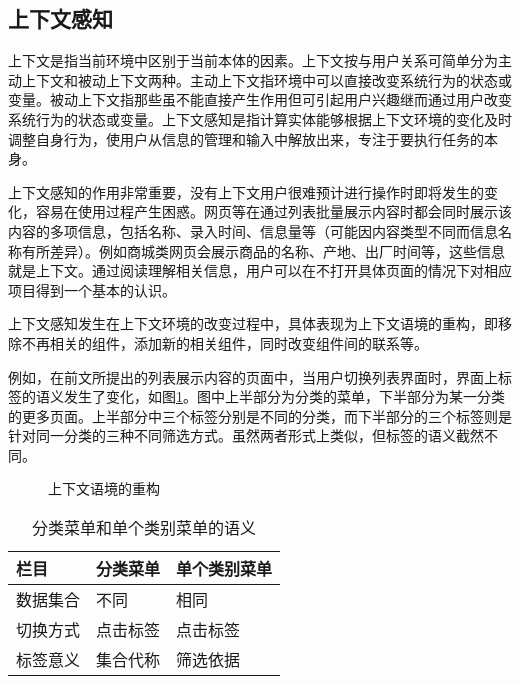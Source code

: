\subsection{上下文感知}
上下文是指当前环境中区别于当前本体的因素。上下文按与用户关系可简单分为主动上下文和被动上下文两种。主动上下文指环境中可以直接改变系统行为的状态或变量。被动上下文指那些虽不能直接产生作用但可引起用户兴趣继而通过用户改变系统行为的状态或变量。上下文感知是指计算实体能够根据上下文环境的变化及时调整自身行为，使用户从信息的管理和输入中解放出来，专注于要执行任务的本身。

上下文感知的作用非常重要，没有上下文用户很难预计进行操作时即将发生的变化，容易在使用过程产生困惑。网页等在通过列表批量展示内容时都会同时展示该内容的多项信息，包括名称、录入时间、信息量等（可能因内容类型不同而信息名称有所差异）。例如商城类网页会展示商品的名称、产地、出厂时间等，这些信息就是上下文。通过阅读理解相关信息，用户可以在不打开具体页面的情况下对相应项目得到一个基本的认识。

上下文感知发生在上下文环境的改变过程中，具体表现为上下文语境的重构，即移除不再相关的组件，添加新的相关组件，同时改变组件间的联系等。

例如，在前文所提出的列表展示内容的页面中，当用户切换列表界面时，界面上标签的语义发生了变化，如图\ref{fig:context}。图中上半部分为分类的菜单，下半部分为某一分类的更多页面。上半部分中三个标签分别是不同的分类，而下半部分的三个标签则是针对同一分类的三种不同筛选方式。虽然两者形式上类似，但标签的语义截然不同。

\begin{figure}[htp]
\centering
{}
\caption{上下文语境的重构}
\label{fig:context}
\end{figure}

\begin{table}[htbp]
\centering
\caption{分类菜单和单个类别菜单的语义}
\vskip 5pt
\begin{tabular}{lll}
\toprule
栏目 & 分类菜单 & 单个类别菜单 \\
\midrule
数据集合 & 不同 & 相同 \\
切换方式  & 点击标签 & 点击标签 \\
标签意义 & 集合代称 & 筛选依据 \\
\bottomrule
\end{tabular}
\label{tab:collection}
\end{table}

